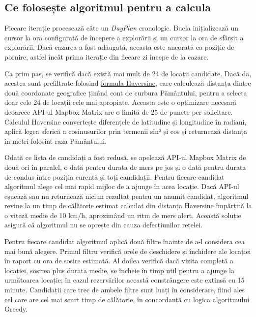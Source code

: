 \subsection{Ce folosește algoritmul pentru a calcula}

Fiecare iterație procesează câte un \textit{DayPlan} cronologic. Bucla inițializează un cursor la ora configurată de începere a explorării și un cursor la ora de sfârșit a explorării. Dacă cazarea a fost adăugată, aceasta este ancorată ca poziție de pornire, astfel încât prima iterație din fiecare zi începe de la cazare.

Ca prim pas, se verifică dacă există mai mult de 24 de locații candidate. Dacă da, acestea sunt prefiltrate folosind \href{https://www.researchgate.net/profile/Mangesh-Nichat-2/publication/282314348_Landmark_based_shortest_path_detection_by_using_A_Algorithm_and_Haversine_Formula/links/56389bb708ae4bde5021b0f5/Landmark-based-shortest-path-detection-by-using-A-Algorithm-and-Haversine-Formula.pdf}{formula Haversine}\cite{hav_ref}, care calculează distanța dintre două coordonate geografice ținând cont de curbura Pământului, pentru a selecta doar cele 24 de locații cele mai apropiate. Aceasta este o optimizare necesară deoarece API-ul Mapbox Matrix are o limită de 25 de puncte per solicitare. Calculul Haversine convertește diferențele de latitudine și longitudine în radiani, aplică legea sferică a cosinusurilor prin termenii sin² și cos și returnează distanța în metri folosint raza Pământului\href{https://journal.universitasbumigora.ac.id/bite/article/view/2874}{}\cite{mapbox_havesine_ref}.

Odată ce lista de candidați a fost redusă, se apelează API-ul Mapbox Matrix de două ori în paralel, o dată pentru durata de mers pe jos și o dată pentru durata de condus între poziția curentă și toți candidații. Pentru fiecare candidat algoritmul alege cel mai rapid mijloc de a ajunge în acea locație. Dacă API-ul eșuează sau nu returnează niciun rezultat pentru un anumit candidat, algoritmul revine la un timp de călătorie estimat calculat din distanța Haversine împărțită la o viteză medie de 10 km/h, aproximând un ritm de mers alert. Această soluție asigură că algoritmul nu se oprește din cauza defecțiunilor rețelei.

Pentru fiecare candidat algoritmul aplică două filtre înainte de a-l considera cea mai bună alegere. Primul filtru verifică orele de deschidere și închidere ale locației în raport cu ora de sosire estimată. Al doilea verifică dacă vizita completă a locației, sosirea plus durata medie, se încheie în timp util pentru a ajunge la următoarea locație; în cazul rezervărilor această constrângere este extinsă cu 15 minute. Candidații care trec de ambele filtre sunt luați în considerare, fiind ales cel care are cel mai scurt timp de călătorie, în concordanță cu logica algoritmului Greedy.

